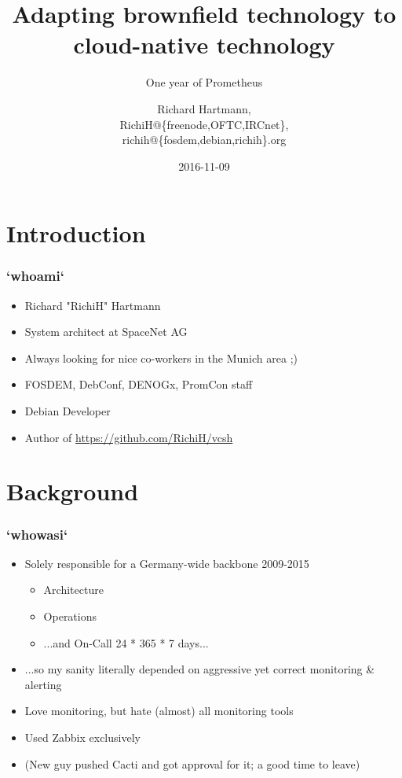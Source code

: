 \documentclass[t]{beamer}
\title{Adapting brownfield technology to cloud-native technology}
\subtitle{One year of Prometheus}
\author{Richard Hartmann,\\
RichiH@\{freenode,OFTC,IRCnet\},\\
richih@\{fosdem,debian,richih\}.org}
\date{2016-11-09}
\begin{document}
\setcounter{tocdepth}{1}

\begin{frame}
	\titlepage
\end{frame}


\section{Introduction}

\begin{frame}
	\frametitle{`whoami`}
	\begin{itemize}
		\item Richard "RichiH" Hartmann
		\item System architect at SpaceNet AG
		\item Always looking for nice co-workers in the Munich area ;)
		\item FOSDEM, DebConf, DENOGx, PromCon staff
		\item Debian Developer
		\item Author of \url{https://github.com/RichiH/vcsh}
	\end{itemize}
\end{frame}

\section{Background}

\begin{frame}
	\frametitle{`whowasi`}
	\begin{itemize}
		\item Solely responsible for a Germany-wide backbone 2009-2015
		\begin{itemize}
			\item Architecture
			\item Operations
			\item ...and On-Call 24 * 365 * 7 days...
		\end{itemize}
		\item ...so my sanity literally depended on aggressive yet correct monitoring \& alerting
		\item Love monitoring, but hate (almost) all monitoring tools
		\item Used Zabbix exclusively
		\item (New guy pushed Cacti and got approval for it; a good time to leave)
	\end{itemize}
\end{frame}
\end{document}
